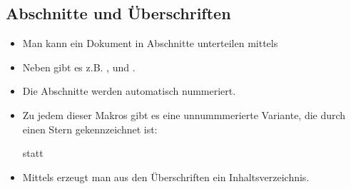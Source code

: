 \subsection{Abschnitte und Überschriften}

\begin{frame}{\subsecname}
    \begin{itemize}
        \item Man kann ein Dokument in \alert{Abschnitte} unterteilen mittels
            \begin{center}
            \end{center}
        \item Neben \code{\\section} gibt es z.B. \code{\\chapter}, \code{\\subsection} und
            \code{\\paragraph}.
        \item Die Abschnitte werden automatisch nummeriert.
        \item Zu jedem dieser Makros gibt es eine unnummmerierte Variante, die durch einen Stern
            gekennzeichnet ist:
            \begin{center}
                \code{\\section*} statt \code{\\section}
            \end{center}
        \item Mittels \code{\\tableofcontents} erzeugt man aus den Überschriften ein
            \alert{Inhaltsverzeichnis}.
    \end{itemize}
\end{frame}
